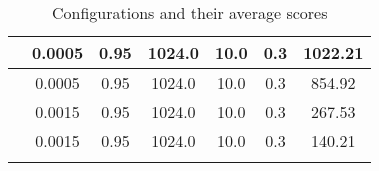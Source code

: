 \begin{table}[h]
\begin{tabular}{|c|c|c|c|c|c|c|}
    \hline
    [128, 32, 256] & 0.0005 & 0.95 & 1024.0 & 10.0 & 0.3 & 1022.21 \\
    \hline
    [128, 256, 64] & 0.0005 & 0.95 & 1024.0 & 10.0 & 0.3 & 854.92 \\
    \hline
    [128, 256, 64] & 0.0015 & 0.95 & 1024.0 & 10.0 & 0.3 & 267.53 \\
    \hline
    [256, 128, 128] & 0.0015 & 0.95 & 1024.0 & 10.0 & 0.3 & 140.21 \\
    \hline
     &  &  &  &  \\
    \hline
    \end{tabular}
    \caption{Configurations and their average scores}
    \label{tab:config_scores}
\end{table}
    